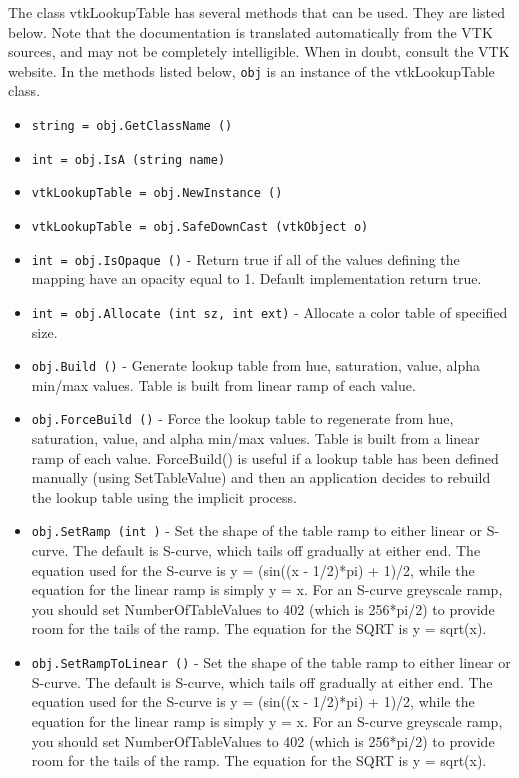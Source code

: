The class vtkLookupTable has several methods that can be used.
  They are listed below.
Note that the documentation is translated automatically from the VTK sources,
and may not be completely intelligible.  When in doubt, consult the VTK website.
In the methods listed below, \verb|obj| is an instance of the vtkLookupTable class.
\begin{itemize}
\item  \verb|string = obj.GetClassName ()|

\item  \verb|int = obj.IsA (string name)|

\item  \verb|vtkLookupTable = obj.NewInstance ()|

\item  \verb|vtkLookupTable = obj.SafeDownCast (vtkObject o)|

\item  \verb|int = obj.IsOpaque ()| -  Return true if all of the values defining the mapping have an opacity
 equal to 1. Default implementation return true.

\item  \verb|int = obj.Allocate (int sz, int ext)| -  Allocate a color table of specified size.

\item  \verb|obj.Build ()| -  Generate lookup table from hue, saturation, value, alpha min/max values. 
 Table is built from linear ramp of each value.

\item  \verb|obj.ForceBuild ()| -  Force the lookup table to regenerate from hue, saturation, value,
 and alpha min/max values.  Table is built from a linear ramp of
 each value.  ForceBuild() is useful if a lookup table has been
 defined manually (using SetTableValue) and then an application
 decides to rebuild the lookup table using the implicit process.

\item  \verb|obj.SetRamp (int )| -  Set the shape of the table ramp to either linear or S-curve.
 The default is S-curve, which tails off gradually at either end.  
 The equation used for the S-curve is y = (sin((x - 1/2)*pi) + 1)/2,
 while the equation for the linear ramp is simply y = x.  For an
 S-curve greyscale ramp, you should set NumberOfTableValues to 402 
 (which is 256*pi/2) to provide room for the tails of the ramp.
 The equation for the SQRT is y = sqrt(x).  

\item  \verb|obj.SetRampToLinear ()| -  Set the shape of the table ramp to either linear or S-curve.
 The default is S-curve, which tails off gradually at either end.  
 The equation used for the S-curve is y = (sin((x - 1/2)*pi) + 1)/2,
 while the equation for the linear ramp is simply y = x.  For an
 S-curve greyscale ramp, you should set NumberOfTableValues to 402 
 (which is 256*pi/2) to provide room for the tails of the ramp.
 The equation for the SQRT is y = sqrt(x).  


\end{itemize}
